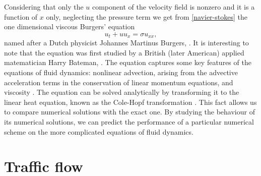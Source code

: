 \documentclass[a4paper,12pt,twoside]{report}%
\begin{document}
Considering that only the $ u $ component of the velocity field is nonzero and it is a function of $ x $ only, neglecting the pressure term we get from \eqref{navier-stokes} the one dimensional viscous Burgers' equation 
\begin{equation}
u_t + uu_x = \sigma u_{xx},
\label{burg}
\end{equation}
named after a Dutch physicist Johannes Martinus Burgers, \cite{burgers}. It is interesting to note that the equation was first studied by a British (later American) applied matematician Harry Bateman, \cite{bateman}.
The equation captures some  key features of the equations of fluid dynamics: nonlinear advection, arising from the advective acceleration terms in the conservation of linear momentum equations, and viscosity \cite{lev}. The equation can be solved analytically by transforming it to the linear heat equation, known as the Cole-Hopf transformation \cite{olv, whitham}. This fact allows us to compare numerical solutions with the exact one. By studying the behaviour of its numerical solutions, we can predict the performance of a particular numerical scheme on the more complicated equations of fluid dynamics.

\section{Traffic flow}
\end{document}
